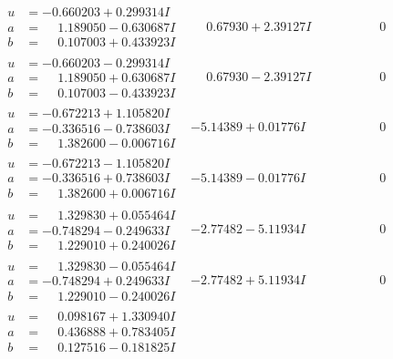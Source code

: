 \documentclass[1p]{elsarticle_modified}
\theoremstyle{definition}
\begin{document}
$$\begin{array}{c|c|c}
\begin{aligned}
u &= -0.660203 + 0.299314 I \\
a &= \phantom{-}1.189050 - 0.630687 I \\
b &= \phantom{-}0.107003 + 0.433923 I\end{aligned}
 & \phantom{-}0.67930 + 2.39127 I & \phantom{-0.000000 } 0 \\ \hline\begin{aligned}
u &= -0.660203 - 0.299314 I \\
a &= \phantom{-}1.189050 + 0.630687 I \\
b &= \phantom{-}0.107003 - 0.433923 I\end{aligned}
 & \phantom{-}0.67930 - 2.39127 I & \phantom{-0.000000 } 0 \\ \hline\begin{aligned}
u &= -0.672213 + 1.105820 I \\
a &= -0.336516 - 0.738603 I \\
b &= \phantom{-}1.382600 - 0.006716 I\end{aligned}
 & -5.14389 + 0.01776 I & \phantom{-0.000000 } 0 \\ \hline\begin{aligned}
u &= -0.672213 - 1.105820 I \\
a &= -0.336516 + 0.738603 I \\
b &= \phantom{-}1.382600 + 0.006716 I\end{aligned}
 & -5.14389 - 0.01776 I & \phantom{-0.000000 } 0 \\ \hline\begin{aligned}
u &= \phantom{-}1.329830 + 0.055464 I \\
a &= -0.748294 - 0.249633 I \\
b &= \phantom{-}1.229010 + 0.240026 I\end{aligned}
 & -2.77482 - 5.11934 I & \phantom{-0.000000 } 0 \\ \hline\begin{aligned}
u &= \phantom{-}1.329830 - 0.055464 I \\
a &= -0.748294 + 0.249633 I \\
b &= \phantom{-}1.229010 - 0.240026 I\end{aligned}
 & -2.77482 + 5.11934 I & \phantom{-0.000000 } 0 \\ \hline\begin{aligned}
u &= \phantom{-}0.098167 + 1.330940 I \\
a &= \phantom{-}0.436888 + 0.783405 I \\
b &= \phantom{-}0.127516 - 0.181825 I\end{aligned}

\end{array}$$
\end{document}
